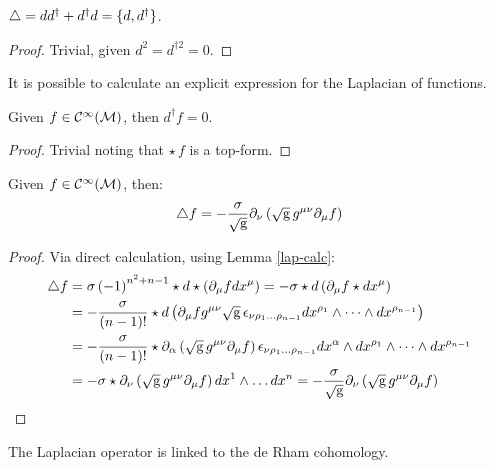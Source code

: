 \begin{proposition}
  $ \triangle = dd^{\dagger} + d^{\dagger}d = \{d,d^{\dagger}\} $.
\end{proposition}
\begin{proof}
  Trivial, given $ d^2 = d^{\dagger 2} = 0 $.
\end{proof}

It is possible to calculate an explicit expression for the Laplacian of functions.

\begin{lemma}\label{lap-calc}
  Given $ f \in \mathcal{C}^{\infty}(\mathcal{M}) $, then $ d^{\dagger} f = 0 $.
\end{lemma}
\begin{proof}
  Trivial noting that $ \star\, f $ is a top-form.
\end{proof}

\begin{proposition}
  Given $ f \in \mathcal{C}^{\infty}(\mathcal{M}) $, then:
  \begin{equation}
    \triangle f = - \frac{\sigma}{\sqrt{\mathrm{g}}} \partial_{\nu} \left( \sqrt{\mathrm{g}}\, g^{\mu \nu} \partial_{\mu} f \right)
    \label{eq:3.22}
  \end{equation}
\end{proposition}
\begin{proof}
  Via direct calculation, using Lemma \ref{lap-calc}:
  \begin{equation*}
    \begin{split}
      \triangle f
      &= \sigma \left( -1 \right)^{n^2 + n - 1} \star d \star \left( \partial_{\mu} f dx^{\mu} \right) = - \sigma \star d \left( \partial_{\mu} f \star dx^{\mu} \right) \\
      &= - \frac{\sigma}{(n-1)!} \star d \left( \partial_{\mu} f g^{\mu \nu} \sqrt{\mathrm{g}}\, \epsilon_{\nu \rho_1 \dots \rho_{n-1}} dx^{\rho_1} \wedge \dots \wedge dx^{\rho_{n-1}} \right) \\
      &= - \frac{\sigma}{(n-1)!} \star \partial_{\alpha} \left( \sqrt{\mathrm{g}}\, g^{\mu \nu} \partial_{\mu} f \right) \epsilon_{\nu \rho_1 \dots \rho_{n-1}} dx^{\alpha} \wedge dx^{\rho_1} \wedge \dots \wedge dx^{\rho_{n-1}} \\
      &= - \sigma \star \partial_{\nu} \left( \sqrt{\mathrm{g}}\, g^{\mu \nu} \partial_{\mu} f \right) dx^1 \wedge \dots dx^n = - \frac{\sigma}{\sqrt{\mathrm{g}}} \partial_{\nu} \left( \sqrt{\mathrm{g}}\, g^{\mu \nu} \partial_{\mu} f \right)
    \end{split}
  \end{equation*}
\end{proof}

The Laplacian operator is linked to the de Rham cohomology.

